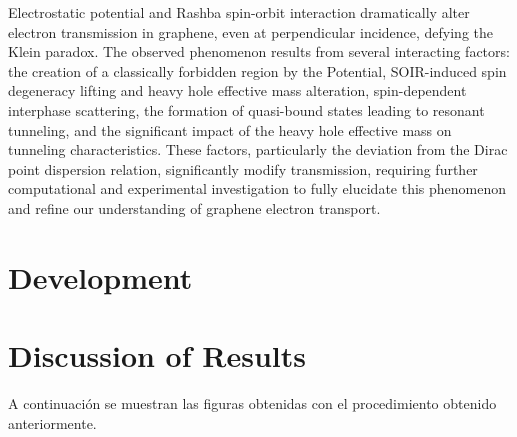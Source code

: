 \documentclass[twocolumn]{revtex4-2}
\begin{document}
    Electrostatic potential and Rashba spin-orbit interaction dramatically alter electron transmission in graphene, even at perpendicular incidence, defying the Klein paradox.
    The observed phenomenon results from several interacting factors: the creation of a classically forbidden region by the Potential, SOIR-induced spin degeneracy lifting and heavy hole effective mass alteration, spin-dependent interphase scattering, the formation of quasi-bound states leading to resonant tunneling, and the significant impact of the heavy hole effective mass on tunneling characteristics.
    These factors, particularly the deviation from the Dirac point dispersion relation, significantly modify transmission, requiring further computational and experimental investigation to fully elucidate this phenomenon and refine our understanding of graphene electron transport.

    \section{Development}\label{sec:development}
    

    \section{Discussion of Results}\label{sec:discussion-of-results}

    A continuación se muestran las figuras obtenidas con el procedimiento obtenido anteriormente.
\end{document}
